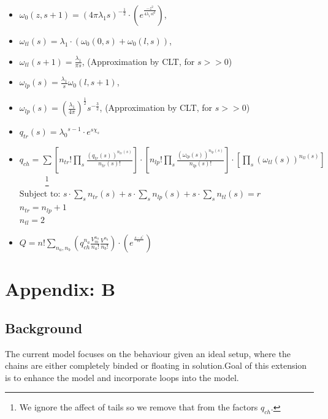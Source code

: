 \documentclass[10pt,letterpaper]{article}
\begin{document}
		\begin{itemize}
			\item $\omega_0(z,s+1)=(4\pi\lambda_1s)^{-\frac{1}{2}} \cdot(e^{\frac{-z^2}{4\lambda_1 s l^2}})$,
			\item $\omega_{tl}(s)=\lambda_1 \cdot(\omega_0(0,s)+\omega_0(l,s))$,
			\item $\omega_{tl}(s+1)=\frac{\lambda_1}{\pi s}$,  (Approximation by CLT, for $s>>0$) 
			\item $\omega_{lp}(s)=\frac{\lambda_1}{s}\omega_0(l,s+1)$,  
			\item $\omega_{lp}(s)=\left(\frac{\lambda_1}{4\pi}\right)^{\frac{1}{2}}s^{-\frac{3}{2}}$, (Approximation by CLT, for $s>>0$) 
			\item $q_{tr}(s)={\lambda_0}^{s-1}\cdot e^{s\chi_s}$
			\item$\displaystyle q_{ch}=\sum \left[n_{tr}!\prod_{s}\frac{\left(q_{tr}(s)\right)^{n_{tr}(s)}}{n_{tr}(s)!}\right]\cdot\left[n_{lp}!\prod_{s}\frac{\left(\omega_{lp}(s)\right)^{n_{lp}(s)}}{n_{lp}(s)!}\right]\cdot\left[\prod_{s}\left(\omega_{tl}(s)\right)^{n_{tl}(s)}\right]$~~~~~~\footnote{We ignore the affect of tails so we remove that from the factors $q_{ch}$.}\\
			 $\displaystyle\text{Subject to:  } s\cdot \sum_{s} n_{tr}(s)+s\cdot \sum_{s} n_{lp}(s)+s \cdot \sum_{s} n_{tl}(s)=r$\\
			 $n_{tr}=n_{lp}+1$\\
			 $n_{tl}=2$
			\item $\displaystyle Q=n!\sum_{n_a,n_b}\left(q_{ch}^{n_{a}}\frac{V_{m}^{n_{a}}}{n_a!}\frac{V^{n_{b}}}{n_b!}\right)\cdot \left(e^{^{\frac{A-A^{*}}{kT}}}\right)$
		\end{itemize}




\section{Appendix: B}

\subsection{Background}
The current model focuses on the behaviour given an ideal setup, where the chains are either completely binded or floating in solution.Goal of this extension is to enhance the model and incorporate loops into the model.
 
\end{document}
